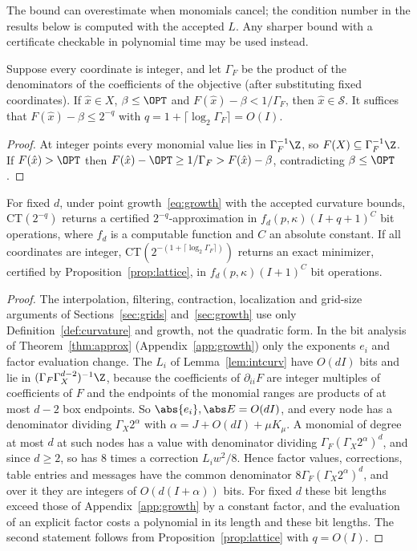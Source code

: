The bound can overestimate when monomials cancel; the condition number in
the results below is computed with the accepted $L$. Any sharper bound with a
certificate checkable in polynomial time may be used instead.

\begin{proposition}\label{prop:lattice}
Suppose every coordinate is integer, and let $\Gamma_F$ be the product of
the denominators of the coefficients of the objective (after substituting
fixed coordinates). If $\hat x\in X$, $\beta\le\OPT$ and
$F(\hat x)-\beta<1/\Gamma_F$, then $\hat x\in\mathcal S$. It suffices that
$F(\hat x)-\beta\le2^{-q}$ with $q=1+\lceil\log_2\Gamma_F\rceil=O(I)$.
\end{proposition}

\begin{proof}
At integer points every monomial value lies in $\Gamma_F^{-1}\Z$, so
$F(X)\subseteq\Gamma_F^{-1}\Z$. If $F(\hat x)>\OPT$ then
$F(\hat x)-\OPT\ge1/\Gamma_F>F(\hat x)-\beta$, contradicting $\beta\le\OPT$.
\end{proof}

\begin{corollary}\label{cor:poly}
For fixed $d$, under point growth~\eqref{eq:growth} with the accepted
curvature bounds, CT$(2^{-q})$ returns a certified $2^{-q}$-approximation in
$f_d(p,\kappa)(I+q+1)^{C}$ bit operations, where $f_d$ is a computable
function and $C$ an absolute constant. If all coordinates are integer,
CT$(2^{-(1+\lceil\log_2\Gamma_F\rceil)})$ returns an exact minimizer, certified
by Proposition~\ref{prop:lattice}, in $f_d(p,\kappa)(I+1)^C$ bit operations.
\end{corollary}

\begin{proof}
The interpolation, filtering, contraction, localization and grid-size
arguments of Sections~\ref{sec:grids} and~\ref{sec:growth} use only
Definition~\ref{def:curvature} and growth, not the quadratic form. In the bit
analysis of Theorem~\ref{thm:approx} (Appendix~\ref{app:growth}) only the
exponents $e_i$ and factor evaluation change. The $L_i$ of
Lemma~\ref{lem:intcurv} have $O(dI)$ bits and lie in
$(\Gamma_F\Gamma_X^{d-2})^{-1}\Z$, because the coefficients of
$\partial_{ii}F$ are integer multiples of coefficients of $F$ and the
endpoints of the monomial ranges are products of at most $d-2$ box endpoints.
So $\abs{e_i},\abs E=O(dI)$, and every node has a denominator dividing
$\Gamma_X2^\alpha$ with $\alpha=J+O(dI)+\mu K_\mu$. A monomial of degree at
most $d$ at such nodes has a value with denominator dividing
$\Gamma_F(\Gamma_X2^\alpha)^d$, and since $d\ge2$, so has $8$ times a
correction $L_iw^2/8$. Hence factor values, corrections, table entries and
messages have the common denominator $8\Gamma_F(\Gamma_X2^\alpha)^d$, and
over it they are integers of $O(d(I+\alpha))$ bits. For fixed $d$ these bit lengths exceed those of
Appendix~\ref{app:growth} by a constant factor, and the evaluation of an
explicit factor costs a polynomial in its length and these bit lengths. The
second statement follows from Proposition~\ref{prop:lattice} with $q=O(I)$.
\end{proof}

